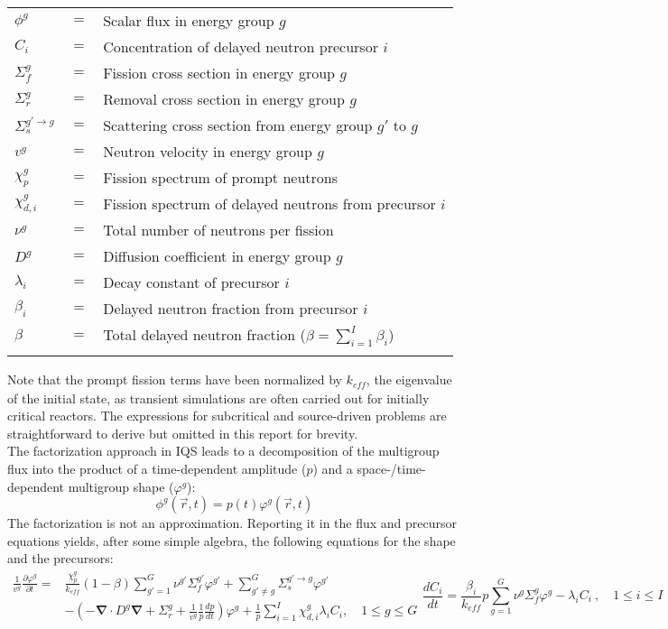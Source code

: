 \documentclass[12pt]{scrartcl}
\renewcommand{\div}{\bs{\nabla}\! \cdot \!}
\newcommand{\grad}{\bs{\nabla}}
\newcommand{\bs}[1]{\mathbf{#1}}
\newcommand{\keff}{k_\textit{eff}}
\newcommand{\be}{\begin{equation}}
\newcommand{\ee}{\end{equation}}
\begin{document}
\begin{tabular}{lll}
$\phi^g$				&	$=$	&	Scalar flux in energy group $g$ \\
$C_i$					&	$=$	&	Concentration of delayed neutron precursor $i$ \\
$\Sigma_f^{g}$			&	$=$	&	Fission cross section in energy group $g$ \\
$\Sigma_r^{g}$			&	$=$	&	Removal cross section in energy group $g$ \\
$\Sigma_s^{g' \to g}$	&	$=$	&	Scattering cross section from energy group $g'$ to $g$ \\
$v^g$					&	$=$	&	Neutron velocity in energy group $g$ \\
$\chi_p^g$				&	$=$	&	Fission spectrum of prompt neutrons \\
$\chi_{d,i}^g$			&	$=$	&	Fission spectrum of delayed neutrons from precursor $i$ \\
$\nu^g$					&	$=$	&	Total number of neutrons per fission \\
$D^g$					&	$=$	&	Diffusion coefficient in energy group $g$\\
$\lambda_i$				&	$=$	&	Decay constant of precursor $i$ \\
$\beta_i$				&	$=$	&	Delayed neutron fraction  from precursor $i$ \\
$\beta$			 	&	$=$	&	Total delayed neutron fraction ($\beta = \sum_{i=1}^I \beta_{i}$) \\
  & & 
\end{tabular}

Note that the prompt fission terms have been normalized by $\keff$, the eigenvalue of the initial state, as transient simulations are often carried out for initially critical reactors. The expressions for subcritical and source-driven problems are straightforward to derive but omitted in this report for brevity. \\

The factorization approach in IQS leads to a decomposition of the multigroup flux into the product of a time-dependent amplitude ($p$) and a space-/time-dependent multigroup shape ($\varphi^g$):
\be
\phi^g(\vec{r},t)=p(t)\varphi^g(\vec{r},t)
\ee
The factorization is not an approximation. Reporting it in the flux and precursor equations yields, after some simple algebra, the following equations for the shape and the precursors:
\begin{subequations}
\begin{align}
\frac{1}{v^g}\frac{\partial\varphi^g}{\partial t} = &\frac{\chi_p^g}{\keff} (1-\beta)\sum_{g'=1}^G  \nu^{g'} \Sigma_f^{g'} \varphi^{g'} + \sum_{g'\neq g}^G\Sigma_s^{g'\to g} \varphi^{g'} \nonumber \\ 
& -  \left( -\div D^g \grad  + \Sigma_r^g + \frac{1}{v^g}\frac{1}{p}\frac{dp}{dt}\right) \varphi^g + \frac{1}{p}\sum_{i=1}^I\chi_{d,i}^g\lambda_iC_i  , \quad 1 \le g \le G 
\label{eq:shape2}
\end{align}
\be
\frac{dC_i}{dt} = \frac{\beta_i}{\keff}p \sum_{g=1}^G\nu^{g} \Sigma_f^g \varphi^{g} - \lambda_i C_i \ , \quad 1 \le i \le I 
\label{eq:preq2}
\ee
\end{subequations}
\end{document}
